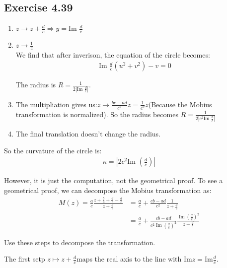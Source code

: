 \documentclass[]{ctexart}
\begin{document}
	\subsection{Exercise 4.39}
		\begin{enumerate}
			\item $z\rightarrow z+\frac{d}{c}\Rightarrow y=\text{Im }\frac{d}{c}$
			\item $z\rightarrow \frac{1}{z}$\\
			We find that after inverison, the equation of the circle becomes:
				\begin{equation*}
				\begin{aligned}
					\text{Im }\frac{d}{c}(u^2+v^2)-v=0
				\end{aligned}
				\end{equation*}
				
			The radius is $R=\frac{1}{2|\text{Im }\frac{d}{c}|}$.
			\item The multipliation gives us:$z\rightarrow \frac{bc-ad}{c^2}z=\frac{1}{c^2}z$(Because the Mobius transformation is normalized). So the radius becomes $R=\frac{1}{2|c^2\text{Im }\frac{d}{c}|}$
			\item The final translation doesn't change the radius. 
		\end{enumerate}
		
		So the curvature of the circle is:
			\begin{equation*}
			\begin{aligned}
				\kappa =\left|2c^2\text{Im }\left(\frac{d}{c}\right)\right|
			\end{aligned}
			\end{equation*}
		
		However, it is just the computation, not the geometrical proof. To see a geometrical proof, we can decompose the Mobius transformation as:
			\begin{equation*}
			\begin{aligned}
				M(z)=\frac{a}{c}\frac{z+\frac{b}{a}+\frac{d}{c}-\frac{d}{c}}{z+\frac{d}{c}}&=\frac{a}{c}+\frac{cb-ad}{c^2}\frac{1}{z+\frac{d}{c}}\\
				&=\frac{a}{c}+\frac{cb-ad}{c^2\operatorname{Im}(\frac{d}{c})^2}\frac{\operatorname{Im}(\frac{d}{c})^2}{z+\frac{d}{c}}
			\end{aligned}
			\end{equation*}
			
		Use these steps to decompose the transformation. 
		
		The first setp $z\mapsto z+\frac{d}{c}$maps the real axis to the line with $\text{Im}z=\text{Im}\frac{d}{c}$.
		
\end{document}
